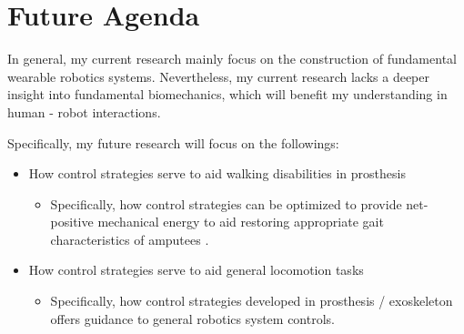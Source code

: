 \documentclass[8pt]{article}
\begin{document}
    

\section{Future Agenda} \label{sec:Agenda}

In general, my current research mainly focus on the construction of fundamental wearable robotics systems. Nevertheless, my current research lacks a deeper insight into fundamental biomechanics, which will benefit my understanding in human - robot interactions.  

Specifically, my future research will focus on the followings:

\begin{itemize}

    \item {How control strategies serve to aid walking disabilities in prosthesis}
    \begin{itemize}
        \item {Specifically, how control strategies can be optimized to provide net-positive mechanical energy to aid restoring appropriate gait characteristics of amputees \cite{OSL2020}. }
    \end{itemize}
    \item {How control strategies serve to aid general locomotion tasks}
    \begin{itemize}
        \item {Specifically, how control strategies developed in prosthesis / exoskeleton offers guidance to general robotics system controls.}
    \end{itemize}


\end{itemize}



\end{document}

